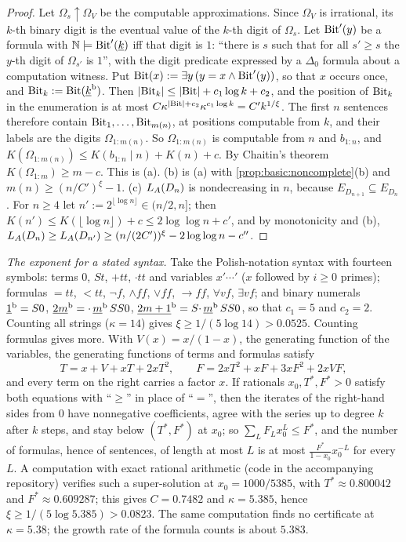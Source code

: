 \begin{proof}
Let $\Omega_s\uparrow\Omega_V$ be the computable approximations. Since $\Omega_V$ is irrational, its $k$-th binary digit is the eventual value of the $k$-th digit of $\Omega_s$. Let $\mathrm{Bit}'(y)$ be a formula with $\mathbb N\models\mathrm{Bit}'(\underline{k})$ iff that digit is $1$: ``there is $s$ such that for all $s'\ge s$ the $y$-th digit of $\Omega_{s'}$ is $1$'', with the digit predicate expressed by a $\Delta_0$ formula about a computation witness. Put $\mathrm{Bit}(x):=\exists y\,(y=x\wedge\mathrm{Bit}'(y))$, so that $x$ occurs once, and $\mathrm{Bit}_k:=\mathrm{Bit}(\underline{k}^{\rm b})$. Then $\lvert\mathrm{Bit}_k\rvert\le\lvert\mathrm{Bit}\rvert+c_1\log k+c_2$, and the position of $\mathrm{Bit}_k$ in the enumeration is at most $C\kappa^{\lvert\mathrm{Bit}\rvert+c_2}\kappa^{c_1\log k}=C'k^{1/\xi}$. The first $n$ sentences therefore contain $\mathrm{Bit}_1,\dots,\mathrm{Bit}_{m(n)}$, at positions computable from $k$, and their labels are the digits $\Omega_{1:m(n)}$. So $\Omega_{1:m(n)}$ is computable from $n$ and $b_{1:n}$, and $K(\Omega_{1:m(n)})\le K(b_{1:n}\mid n)+K(n)+c$. By Chaitin's theorem $K(\Omega_{1:m})\ge m-c$. This is (a). (b) is (a) with \cref{prop:basic:noncomplete}(b) and $m(n)\ge(n/C')^\xi-1$. (c) $L_{A}(D_n)$ is nondecreasing in $n$, because $E_{D_{n+1}}\subseteq E_{D_n}$. For $n\ge4$ let $n':=2^{\lfloor\log n\rfloor}\in(n/2,n]$; then $K(n')\le K(\lfloor\log n\rfloor)+c\le2\log\log n+c'$, and by monotonicity and (b), $L_{A}(D_n)\ge L_{A}(D_{n'})\ge(n/(2C'))^\xi-2\log\log n-c''$.
\end{proof}

\emph{The exponent for a stated syntax.} Take the Polish-notation syntax with fourteen symbols: terms $0$, $St$, ${+}tt$, ${\cdot}tt$ and variables $x'\cdots'$ ($x$ followed by $i\ge0$ primes); formulas ${=}tt$, ${<}tt$, $\neg f$, ${\wedge}ff$, ${\vee}ff$, ${\to}ff$, $\forall vf$, $\exists vf$; and binary numerals $\underline{1}^{\rm b}=S0$, $\underline{2m}^{\rm b}={\cdot}\,\underline{m}^{\rm b}\,SS0$, $\underline{2m+1}^{\rm b}=S{\cdot}\,\underline{m}^{\rm b}\,SS0$, so that $c_1=5$ and $c_2=2$. Counting all strings ($\kappa=14$) gives $\xi\ge1/(5\log14)>0.0525$. Counting formulas gives more. With $V(x)=x/(1-x)$, the generating function of the variables, the generating functions of terms and formulas satisfy
\[
T=x+V+xT+2xT^2,\qquad F=2xT^2+xF+3xF^2+2xVF,
\]
and every term on the right carries a factor $x$. If rationals $x_0,T^*,F^*>0$ satisfy both equations with ``$\ge$'' in place of ``$=$'', then the iterates of the right-hand sides from $0$ have nonnegative coefficients, agree with the series up to degree $k$ after $k$ steps, and stay below $(T^*,F^*)$ at $x_0$; so $\sum_LF_Lx_0^L\le F^*$, and the number of formulas, hence of sentences, of length at most $L$ is at most $\frac{F^*}{1-x_0}x_0^{-L}$ for every $L$. A computation with exact rational arithmetic (code in the accompanying repository) verifies such a super-solution at $x_0=1000/5385$, with $T^*\approx0.800042$ and $F^*\approx0.609287$; this gives $C=0.7482$ and $\kappa=5.385$, hence $\xi\ge1/(5\log5.385)>0.0823$. The same computation finds no certificate at $\kappa=5.38$; the growth rate of the formula counts is about $5.383$.

